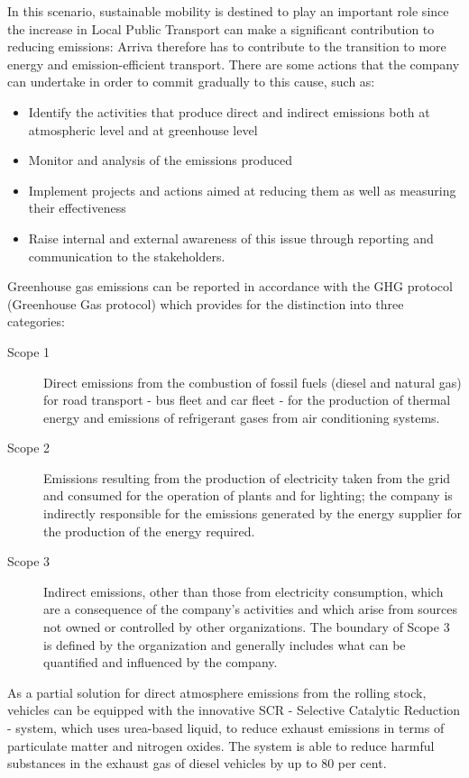 In this scenario, sustainable mobility is destined to play an important role since the increase in Local Public Transport can make a significant contribution to reducing emissions: Arriva therefore has to contribute to the transition to more energy and emission-efficient transport.
There are some actions that the company can undertake in order to commit gradually to this cause, such as:
\begin{itemize}
    \item Identify the activities that produce direct and indirect emissions both at atmospheric level and at greenhouse level
    \item Monitor and analysis of the emissions produced
    \item Implement projects and actions aimed at reducing them as well as measuring their effectiveness
    \item Raise internal and external awareness of this issue through reporting and communication to the stakeholders.
\end{itemize}

Greenhouse gas emissions can be reported in accordance with the GHG protocol (Greenhouse Gas protocol) \cite{ghgprotocol} which provides for the distinction into three categories:
\begin{description}
   \item[Scope 1] Direct emissions from the combustion of fossil fuels (diesel and natural gas) for road transport - bus fleet and car fleet - for the production of thermal energy and emissions of refrigerant gases from air conditioning systems. 
   \item[Scope 2] Emissions resulting from the production of electricity taken from the grid and consumed for the operation of plants and for lighting; the company is indirectly responsible for the emissions generated by the energy supplier for the production of the energy required. 
   \item[Scope 3] Indirect emissions, other than those from electricity consumption, which are a consequence of the company's activities and which arise from sources not owned or controlled by other organizations. The boundary of Scope 3 is defined by the organization and generally includes what can be quantified and influenced by the company.
\end{description}

As a partial solution for direct atmosphere emissions from the rolling stock, vehicles can be equipped with the innovative SCR - Selective Catalytic Reduction - system, which uses urea-based liquid, to reduce exhaust emissions in terms of particulate matter and nitrogen oxides. The system is able to reduce harmful substances in the exhaust gas of diesel vehicles by up to 80 per cent.

